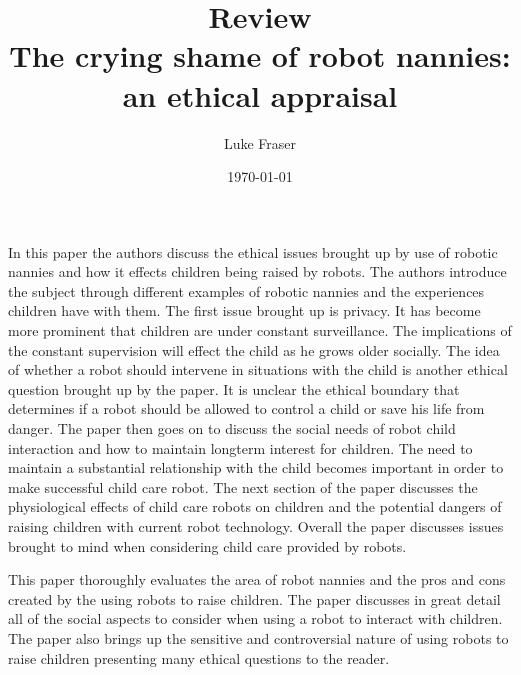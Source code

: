 \documentclass{article}
\begin{document}
\title{{\large Review} \\ The crying shame of robot nannies: an ethical appraisal}
\author{Luke Fraser}
\date{\today}
\maketitle

\begingroup
\renewcommand{\section}[2]{}


\endgroup

\section*{Summary}
In this paper the authors discuss the ethical issues brought up by use of robotic nannies and how it effects children being raised by robots. The authors introduce the subject through different examples of robotic nannies and the experiences children have with them. The first issue brought up is privacy. It has become more prominent that children are under constant surveillance. The implications of the constant supervision will effect the child as he grows older socially. The idea of whether a robot should intervene in situations with the child is another ethical question brought up by the paper. It is unclear the ethical boundary that determines if a robot should be allowed to control a child or save his life from danger. The paper then goes on to discuss the social needs of robot child interaction and how to maintain longterm interest for children. The need to maintain a substantial relationship with the child becomes important in order to make successful child care robot. The next section of the paper discusses the physiological effects of child care robots on children and the potential dangers of raising children with current robot technology. Overall the paper discusses issues brought to mind when considering child care provided by robots.
\section*{Strengths}
This paper thoroughly evaluates the area of robot nannies and the pros and cons created by the using robots to raise children. The paper discusses in great detail all of the social aspects to consider when using a robot to interact with children. The paper also brings up the sensitive and controversial nature of using robots to raise children presenting many ethical questions to the reader.
\end{document}
